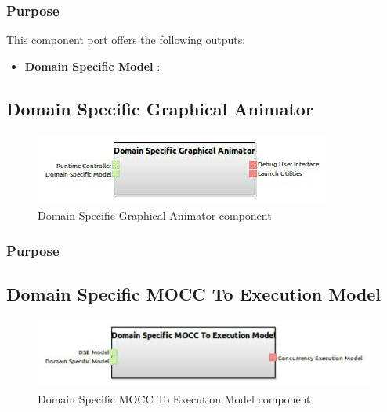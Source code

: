 \documentclass{gemoc} %
\begin{document}
\subsubsection{Purpose}


This component port offers the following outputs:
\begin{itemize}
  \item \textbf{Domain Specific Model} :
\end{itemize}

\subsection{Domain Specific Graphical Animator}

\begin{figure}[htp]
	\begin{center}
	\includegraphics*[trim=0.0cm 0.0cm 0cm 0.0cm, clip=true, scale=1.0]{../images/generated/Generated_Domain Specific Graphical Animator.jpg}
	\caption{Domain Specific Graphical Animator component}
	\end{center}
\end{figure}

\subsubsection{Purpose}



\subsection{Domain Specific MOCC To Execution Model}

\begin{figure}[htp]
	\begin{center}
	\includegraphics*[trim=0.0cm 0.0cm 0cm 0.0cm, clip=true, scale=1.0]{../images/generated/Generated_Domain Specific MOCC To Execution Model.jpg}
	\caption{Domain Specific MOCC To Execution Model component}
	\end{center}
\end{figure}
\end{document}
